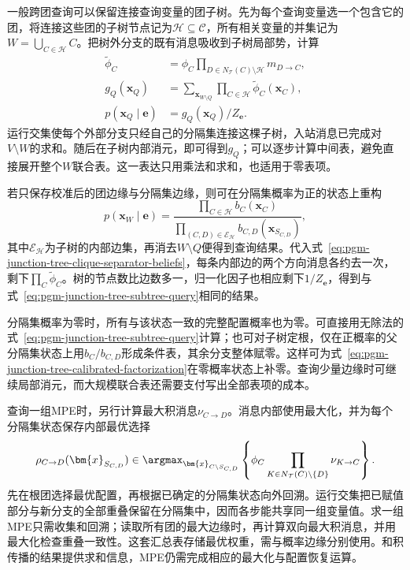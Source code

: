 一般跨团查询可以保留连接查询变量的团子树。先为每个查询变量选一个包含它的团，将连接这些团的子树节点记为$\mathcal H\subseteq\mathcal C$，所有相关变量的并集记为$W=\bigcup_{C\in\mathcal H}C$。把树外分支的既有消息吸收到子树局部势，计算
\begin{equation}
  \begin{aligned}
    \widetilde{\phi}_C
      &=\phi_C
        \prod_{D\in N_{\mathcal{T}}(C)\setminus\mathcal{H}}m_{D\to C},\\
    g_Q(\bm{x}_Q)
      &=\sum_{\bm{x}_{W\setminus Q}}
         \prod_{C\in\mathcal{H}}\widetilde{\phi}_C(\bm{x}_C),\\
    p(\bm{x}_Q\mid\bm{e})&=g_Q(\bm{x}_Q)/Z_{\bm{e}}.
  \end{aligned}
  \label{eq:pgm-junction-tree-subtree-query}
\end{equation}
运行交集使每个外部分支只经自己的分隔集连接这棵子树，入站消息已完成对$V\setminus W$的求和。随后在子树内部消元，即可得到$g_Q$；可以逐步计算中间表，避免直接展开整个$W$联合表。这一表达只用乘法和求和，也适用于零表项。

若只保存校准后的团边缘与分隔集边缘，则可在分隔集概率为正的状态上重构
\begin{equation}
  p(\bm{x}_W\mid\bm{e})
    =\frac{\prod_{C\in\mathcal{H}}b_C(\bm{x}_C)}
           {\prod_{(C,D)\in\mathcal{E}_{\mathcal{H}}}
                b_{C,D}(\bm{x}_{S_{C,D}})},
  \label{eq:pgm-junction-tree-calibrated-factorization}
\end{equation}
其中$\mathcal E_{\mathcal H}$为子树的内部边集，再消去$W\setminus Q$便得到查询结果。代入式~\eqref{eq:pgm-junction-tree-clique-separator-beliefs}，每条内部边的两个方向消息各约去一次，剩下$\prod_C\widetilde\phi_C$。树的节点数比边数多一，归一化因子也相应剩下$1/Z_{\bm e}$，得到与式~\eqref{eq:pgm-junction-tree-subtree-query}相同的结果。

分隔集概率为零时，所有与该状态一致的完整配置概率也为零。可直接用无除法的式~\eqref{eq:pgm-junction-tree-subtree-query}计算；也可对子树定根，仅在正概率的父分隔集状态上用$b_C/b_{C,D}$形成条件表，其余分支整体赋零。这样可为式~\eqref{eq:pgm-junction-tree-calibrated-factorization}在零概率状态上补零。查询少量边缘时可继续局部消元，而大规模联合表还需要支付写出全部表项的成本。

查询一组MPE时，另行计算最大积消息$\nu_{C\to D}$。消息内部使用最大化，并为每个分隔集状态保存内部最优选择
\begin{equation}
  \rho_{C\to D}(\bm{x}_{S_{C,D}})
    \in\argmax_{\bm{x}_{C\setminus S_{C,D}}}
       \left\{\phi_C
          \prod_{K\in N_{\mathcal{T}}(C)\setminus\{D\}}\nu_{K\to C}\right\}.
  \label{eq:pgm-junction-tree-clique-backpointer}
\end{equation}
先在根团选择最优配置，再根据已确定的分隔集状态向外回溯。运行交集把已赋值部分与新分支的全部重叠保留在分隔集中，因而各步能共享同一组变量值。求一组MPE只需收集和回溯；读取所有团的最大边缘时，再计算双向最大积消息，并用最大化检查重叠一致性。这套汇总表存储最优权重，需与概率边缘分别使用。和积传播的结果提供求和信息，MPE仍需完成相应的最大化与配置恢复运算。

